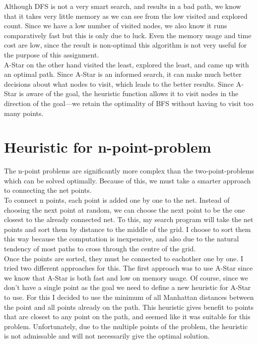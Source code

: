 \documentclass[12pt]{article}
\begin{document}
Although DFS is not a very smart search, and results in a bad path, we know that
it takes very little memory as we can see from the low visited and explored
count.  Since we have a low number of visited nodes, we also know it runs
comparatively fast but this is only due to luck.  Even the memory usage and time
cost are low, since the result is non-optimal this algorithm is not very useful
for the purpose of this assignment.\\

A-Star on the other hand visited the least, explored the least, and came up with
an optimal path.  Since A-Star is an informed search, it can make much better
decisions about what nodes to visit, which leads to the better results.  Since
A-Star is aware of the goal, the heuristic function allows it to visit nodes in
the direction of the goal---we retain the optimality of BFS without having to
visit too many points.\\

\section{Heuristic for n-point-problem}
The n-point problems are significantly more complex than the two-point-problems
which can be solved optimally.  Because of this, we must take a smarter approach
to connecting the net points.\\

To connect n points, each point is added one by one to the net.  Instead of
choosing the next point at random, we can choose the next point to be the one
closest to the already connected net.  To this, my search program will take the
net points and sort them by distance to the middle of the grid.  I choose to
sort them this way because the computation is inexpensive, and also due to the
natural tendency of most paths to cross through the centre of the grid.\\

Once the points are sorted, they must be connected to eachother one by one.  I
tried two different approaches for this.  The first approach was to use A-Star
since we know that A-Star is both fast and low on memory usage.  Of course,
since we don't have a single point as the goal we need to define a new heuristic
for A-Star to use.  For this I decided to use the minimum of all Manhattan
distances between the point and all points already on the path.  This heuristic
gives benefit to points that are closest to any point on the path, and seemed
like it was suitable for this problem.  Unfortunately, due to the multiple
points of the problem, the heuristic is not admissable and will not necessarily
give the optimal solution.\\
\end{document}
